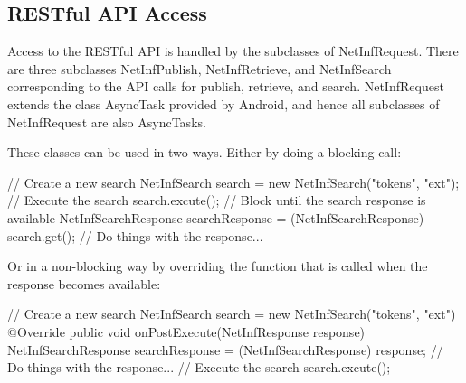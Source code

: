 \subsection{RESTful API Access}

Access to the RESTful API is handled by the subclasses of NetInfRequest. There are three subclasses NetInfPublish, NetInfRetrieve, and NetInfSearch corresponding to the API calls for publish, retrieve, and search. NetInfRequest extends the class AsyncTask provided by Android, and hence all subclasses of NetInfRequest are also AsyncTasks.

These classes can be used in two ways. Either by doing a blocking call:

\begin{code}[language=Java]
	// Create a new search
	NetInfSearch search = new NetInfSearch("tokens", "ext");
	// Execute the search
	search.excute();
	// Block until the search response is available
	NetInfSearchResponse searchResponse =
	        (NetInfSearchResponse) search.get();
	// Do things with the response...
\end{code}

Or in a non-blocking way by overriding the function that is called when the response becomes available:

\begin{code}[language=Java]
	// Create a new search
	NetInfSearch search = new NetInfSearch("tokens", "ext") {
            @Override
            public void onPostExecute(NetInfResponse response) {
                NetInfSearchResponse searchResponse =
                        (NetInfSearchResponse) response;
				// Do things with the response...
            }
    }
    // Execute the search
	search.excute();
\end{code}